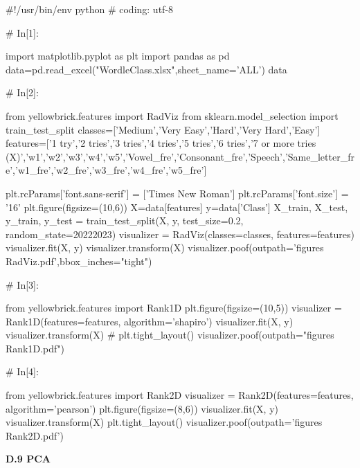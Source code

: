 \documentclass{MathModeling}
\begin{document}
\begin{python}
#!/usr/bin/env python
# coding: utf-8

# In[1]:


import matplotlib.pyplot as plt
import pandas as pd
data=pd.read_excel("WordleClass.xlsx",sheet_name='ALL')
data


# In[2]:


from yellowbrick.features import RadViz
from sklearn.model_selection import train_test_split
classes=['Medium','Very Easy','Hard','Very Hard','Easy']
features=['1 try','2 tries','3 tries','4 tries','5 tries','6 tries','7 or more tries (X)','w1','w2','w3','w4','w5','Vowel_fre','Consonant_fre','Speech','Same_letter_fre','w1_fre','w2_fre','w3_fre','w4_fre','w5_fre']

plt.rcParams['font.sans-serif'] = ['Times New Roman']
plt.rcParams['font.size'] = '16'
plt.figure(figsize=(10,6))
X=data[features]
y=data['Class']
X_train, X_test, y_train, y_test = train_test_split(X, y, test_size=0.2, random_state=20222023)
visualizer = RadViz(classes=classes, features=features)
visualizer.fit(X, y)
visualizer.transform(X)
visualizer.poof(outpath='figures\\RadViz.pdf',bbox_inches="tight")


# In[3]:


from yellowbrick.features import Rank1D
plt.figure(figsize=(10,5))
visualizer = Rank1D(features=features, algorithm='shapiro')
visualizer.fit(X, y)
visualizer.transform(X)
# plt.tight_layout()
visualizer.poof(outpath="figures\\Rank1D.pdf")


# In[4]:


from yellowbrick.features import Rank2D
visualizer = Rank2D(features=features, algorithm='pearson')
plt.figure(figsize=(8,6))
visualizer.fit(X, y)
visualizer.transform(X)
plt.tight_layout()
visualizer.poof(outpath='figures\\Rank2D.pdf')


\end{python}
\newpage
\textbf{D.9 PCA}
\end{document}
